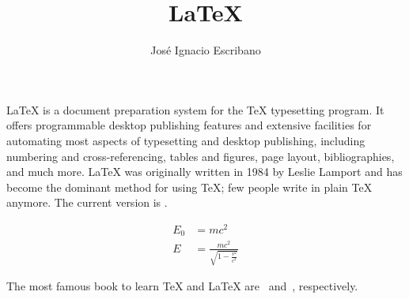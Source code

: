 \documentclass{article}
\title{\LaTeX}
\author{José Ignacio Escribano}
\begin{document}
  \maketitle
  \LaTeX{} is a document preparation system for
  the \TeX{} typesetting program. It offers
  programmable desktop publishing features and
  extensive facilities for automating most
  aspects of typesetting and desktop publishing,
  including numbering and  cross-referencing,
  tables and figures, page layout,
  bibliographies, and much more. \LaTeX{} was
  originally written in 1984 by Leslie Lamport
  and has become the  dominant method for using
  \TeX; few people write in plain \TeX{} anymore.
  The current version is \LaTeXe.

  \begin{align}
    E_0 &= mc^2 \\
    E &= \frac{mc^2}{\sqrt{1-\frac{v^2}{c^2}}}
  \end{align}

  The most famous book to learn \TeX{} and \LaTeX{}
  are~\cite{texbook} and~\cite{latex}, respectively.

  
  
\end{document}
